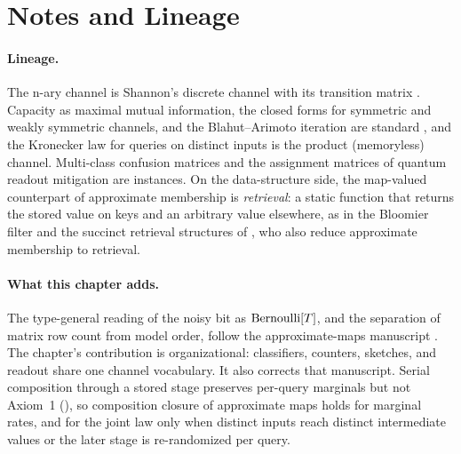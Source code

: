 %

\section{Notes and Lineage}
\label{sec:bib-notes-ch9}

\paragraph{Lineage.}
The n-ary channel is Shannon's discrete channel with its transition matrix
\parencite{shannon-1948}. Capacity as maximal mutual information, the closed
forms for symmetric and weakly symmetric channels, and the Blahut--Arimoto
iteration are standard \parencite[Chs.~7 and~10]{cover-thomas}, and the Kronecker
law for queries on distinct inputs is the product (memoryless) channel. Multi-class
confusion matrices and the assignment matrices of quantum readout mitigation
\parencite{bravyi-et-al-2021,nation-et-al-2021} are instances. On the
data-structure side, the map-valued counterpart of approximate membership is
\emph{retrieval}: a static function that returns the stored value
on keys and an arbitrary value elsewhere, as in the Bloomier
filter \parencite{chazelle-et-al-2004} and the succinct
retrieval structures of \textcite{dietzfelbinger-pagh-2008}, who also reduce
approximate membership to retrieval.

\paragraph{What this chapter adds.}
The type-general reading of the noisy bit as $\mathrm{Bernoulli}[T]$, and the separation
of matrix row count from model order, follow the approximate-maps manuscript
\textcite{towell-bernoulli-maps}. The chapter's contribution is organizational:
classifiers, counters, sketches, and readout share one channel vocabulary. It also
corrects that manuscript. Serial composition through a stored stage preserves
per-query marginals but not Axiom~1 (), so
composition closure of approximate maps holds for marginal rates, and for the
joint law only when distinct inputs reach distinct intermediate values or the
later stage is re-randomized per query.


